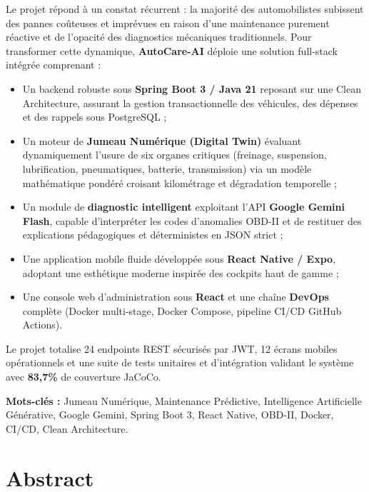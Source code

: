 \documentclass[12pt,a4paper,oneside]{report}
\newcommand{\bpuce}{\textcolor{midBlue}{$\blacktriangleright$}\;}
\begin{document}
Le projet r\'epond \`a un constat r\'ecurrent : la majorit\'e des automobilistes subissent des pannes co\^uteuses et impr\'evues en raison d'une maintenance purement r\'eactive et de l'opacit\'e des diagnostics m\'ecaniques traditionnels. Pour transformer cette dynamique, \textbf{AutoCare-AI} d\'eploie une solution full-stack int\'egr\'ee comprenant :
\begin{itemize}[label=\bpuce]
  \item Un backend robuste sous \textbf{Spring Boot 3 / Java 21} reposant sur une Clean Architecture, assurant la gestion transactionnelle des v\'ehicules, des d\'epenses et des rappels sous PostgreSQL ;
  \item Un moteur de \textbf{Jumeau Num\'erique (Digital Twin)} \'evaluant dynamiquement l'usure de six organes critiques (freinage, suspension, lubrification, pneumatiques, batterie, transmission) via un mod\`ele math\'ematique pond\'er\'e croisant kilom\'etrage et d\'egradation temporelle ;
  \item Un module de \textbf{diagnostic intelligent} exploitant l'API \textbf{Google Gemini Flash}, capable d'interpr\'eter les codes d'anomalies OBD-II et de restituer des explications p\'edagogiques et d\'eterministes en JSON strict ;
  \item Une application mobile fluide d\'evelopp\'ee sous \textbf{React Native / Expo}, adoptant une esth\'etique moderne inspir\'ee des cockpits haut de gamme ;
  \item Une console web d'administration sous \textbf{React} et une cha\^ine \textbf{DevOps} compl\`ete (Docker multi-stage, Docker Compose, pipeline CI/CD GitHub Actions).
\end{itemize}

Le projet totalise 24 endpoints REST s\'ecuris\'es par JWT, 12 \'ecrans mobiles op\'erationnels et une suite de tests unitaires et d'int\'egration validant le syst\`eme avec \textbf{83,7\%} de couverture JaCoCo.

\medskip
\noindent\textbf{Mots-cl\'es :} Jumeau Num\'erique, Maintenance Pr\'edictive, Intelligence Artificielle G\'en\'erative, Google Gemini, Spring Boot 3, React Native, OBD-II, Docker, CI/CD, Clean Architecture.

\clearpage

\chapter*{Abstract}
\end{document}
